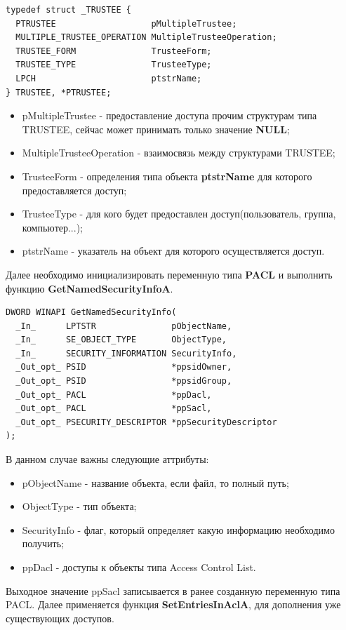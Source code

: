 \begin{lstlisting}[language={}, caption={Структура TRUSTEE }]
typedef struct _TRUSTEE {
  PTRUSTEE                   pMultipleTrustee;
  MULTIPLE_TRUSTEE_OPERATION MultipleTrusteeOperation;
  TRUSTEE_FORM               TrusteeForm;
  TRUSTEE_TYPE               TrusteeType;
  LPCH                       ptstrName;
} TRUSTEE, *PTRUSTEE;
\end{lstlisting}
\begin{itemize}
\item pMultipleTrustee - предоставление доступа прочим структурам типа TRUSTEE, сейчас может принимать только значение \textbf{NULL};
\item MultipleTrusteeOperation - взаимосвязь между структурами TRUSTEE;
\item TrusteeForm - определения типа объекта \textbf{ptstrName} для которого предоставляется доступ;
\item TrusteeType - для кого будет предоставлен доступ(пользователь, группа, компьютер...);
\item ptstrName - указатель на объект для которого осуществляется доступ.
\end{itemize}
Далее необходимо инициализировать переменную типа \textbf{PACL} и выполнить функцию \textbf{GetNamedSecurityInfoA}\cite{GetNamedSecurityInfo}.
\begin{lstlisting}[language={}, caption={Прототип GetNamedSecurityInfo}]
DWORD WINAPI GetNamedSecurityInfo(
  _In_      LPTSTR               pObjectName,
  _In_      SE_OBJECT_TYPE       ObjectType,
  _In_      SECURITY_INFORMATION SecurityInfo,
  _Out_opt_ PSID                 *ppsidOwner,
  _Out_opt_ PSID                 *ppsidGroup,
  _Out_opt_ PACL                 *ppDacl,
  _Out_opt_ PACL                 *ppSacl,
  _Out_opt_ PSECURITY_DESCRIPTOR *ppSecurityDescriptor
);
\end{lstlisting}
В данном случае важны следующие аттрибуты:
\begin{itemize}
\item pObjectName - название объекта, если файл, то полный путь;
\item ObjectType - тип объекта;
\item SecurityInfo - флаг, который определяет какую информацию необходимо получить;
\item ppDacl - доступы к объекты типа Access Control List.
\end{itemize}
Выходное значение ppSacl записывается в ранее созданную переменную типа PACL. Далее применяется функция \textbf{SetEntriesInAclA}\cite{SetEntriesInAcl}, для дополнения уже существующих доступов.
